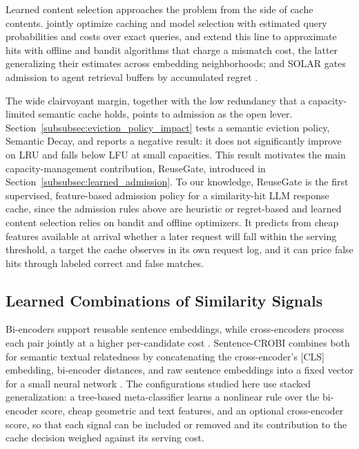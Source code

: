 \documentclass[authoryear,preprint,review,12pt]{elsarticle}
\begin{document}
Learned content selection approaches the problem from the side of cache contents. \citet{zhu2023optimal} jointly optimize caching and model selection with estimated query probabilities and costs over exact queries, \citet{liu2025semantic} and \citet{atalar2026continuous} extend this line to approximate hits with offline and bandit algorithms that charge a mismatch cost, the latter generalizing their estimates across embedding neighborhoods; and SOLAR gates admission to agent retrieval buffers by accumulated regret \citep{sun2026solar}.

The wide clairvoyant margin, together with the low redundancy that a capacity-limited semantic cache holds, points to admission as the open lever. Section~\ref{subsubsec:eviction_policy_impact} tests a semantic eviction policy, Semantic Decay, and reports a negative result: it does not significantly improve on LRU and falls below LFU at small capacities. This result motivates the main capacity-management contribution, ReuseGate, introduced in Section~\ref{subsubsec:learned_admission}. To our knowledge, ReuseGate is the first supervised, feature-based admission policy for a similarity-hit LLM response cache, since the admission rules above are heuristic or regret-based and learned content selection relies on bandit and offline optimizers. It predicts from cheap features available at arrival whether a later request will fall within the serving threshold, a target the cache observes in its own request log, and it can price false hits through labeled correct and false matches.

\subsection{Learned Combinations of Similarity Signals}
\label{subsec:rw_stacking}
Bi-encoders support reusable sentence embeddings, while cross-encoders process each pair jointly at a higher per-candidate cost \citep{reimers2019sentence}. Sentence-CROBI combines both for semantic textual relatedness by concatenating the cross-encoder's [CLS] embedding, bi-encoder distances, and raw sentence embeddings into a fixed vector for a small neural network \citep{OrtizBarajas2024MBZUAI}. The configurations studied here use stacked generalization: a tree-based meta-classifier learns a nonlinear rule over the bi-encoder score, cheap geometric and text features, and an optional cross-encoder score, so that each signal can be included or removed and its contribution to the cache decision weighed against its serving cost.
\end{document}
